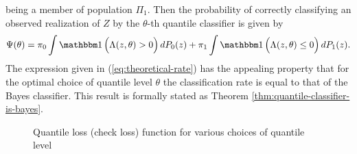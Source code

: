being a member of population $\Pi_1$.  Then the probability of correctly
classifying an observed realization of $Z$ by the $\theta$-th quantile
classifier is given by
\begin{equation}
  \label{eq:theoretical-rate}
  \Psi(\theta) =
  \pi_0 \int \ind\Big( \Lambda(z, \theta) > 0 \Big)\, dP_0(z) +
  \pi_1 \int \ind\Big(\Lambda(z, \theta) \leq 0 \Big)\, dP_1(z).
\end{equation}
The expression given in (\ref{eq:theoretical-rate}) has the appealing property
that for the optimal choice of quantile level $\theta$ the classification rate
is equal to that of the Bayes classifier.  This result is formally stated as
Theorem \ref{thm:quantile-classifier-is-bayes}.

\begin{figure}[h]
  \label{fig:quantile-loss}
  \caption[Quantile loss function]{Quantile loss (check loss) function for
    various choices of quantile level}
  \vspace{5mm}


\end{figure}
